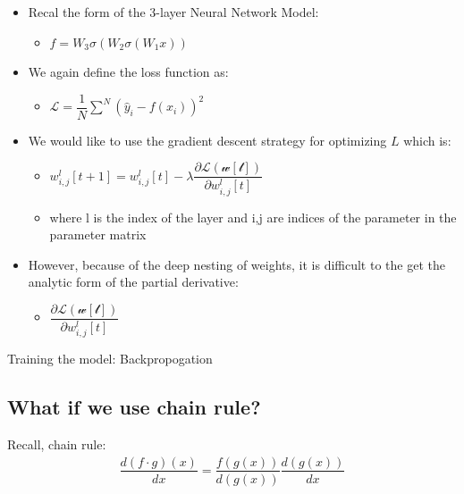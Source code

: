 \documentclass[11pt]{article}
\providecommand{\tightlist}{%
      \setlength{\itemsep}{0pt}\setlength{\parskip}{0pt}}
\begin{document}
\begin{itemize}
\tightlist
\item
  Recal the form of the 3-layer Neural Network Model:

  \begin{itemize}
  \tightlist
  \item
    \(f = W_3\sigma(W_2 \sigma(W_1x))\)
  \end{itemize}
\item
  We again define the loss function as:

  \begin{itemize}
  \tightlist
  \item
    \(\mathcal{L} = \dfrac{1}{N}\sum^{N}(\hat{y}_i - f(x_i))^{2}\)
  \end{itemize}
\item
  We would like to use the gradient descent strategy for optimizing
  \(L\) which is:

  \begin{itemize}
  \tightlist
  \item
    \(w_{i,j}^{l}[t+1] = w_{i,j}^{l}[t] - \lambda \dfrac{\partial \mathcal{L(w[t])}}{\partial{w^l_{i,j}[t]}}\)
  \item
    where l is the index of the layer and i,j are indices of the
    parameter in the parameter matrix
  \end{itemize}
\item
  However, because of the deep nesting of weights, it is difficult to
  the get the analytic form of the partial derivative:

  \begin{itemize}
  \tightlist
  \item
    \(\dfrac{\partial \mathcal{L(w[t])}}{\partial{w^l_{i,j}[t]}}\)
  \end{itemize}
\end{itemize}

    Training the model: Backpropogation

\hypertarget{what-if-we-use-chain-rule}{%
\subsection{What if we use chain
rule?}\label{what-if-we-use-chain-rule}}

Recall, chain rule:\\
\begin{align}
\dfrac{d(f\cdot g)(x)}{dx} = \dfrac{f(g(x))}{d(g(x))}\dfrac{d(g(x))}{dx}
\end{align}
\end{document}

